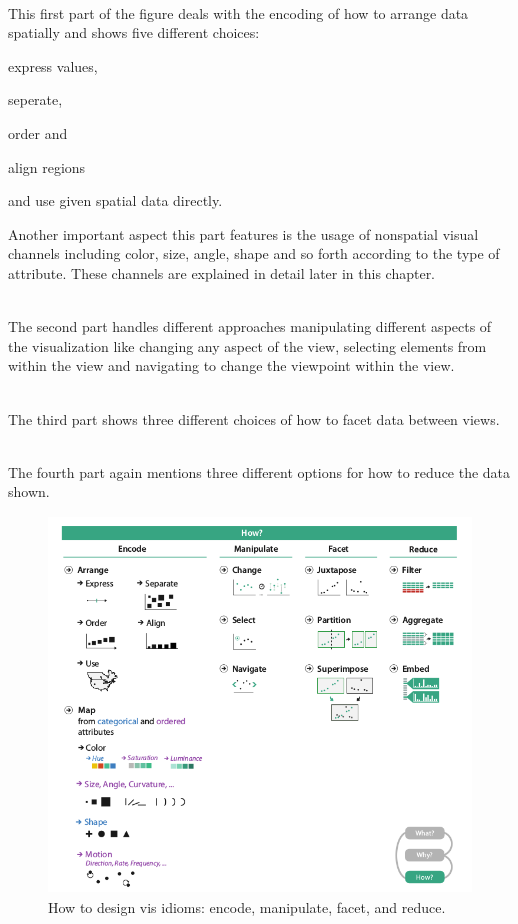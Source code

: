 \begin{enumerate}

 \hfill \\
This first part of the figure deals with the encoding of how to arrange data spatially and shows five different choices:
    \begin{enumerate*}
    \item express values,
    \item seperate,
    \item order and
    \item align regions
    \item and use given spatial data directly.
    \end{enumerate*}
Another important aspect this part features is the usage of nonspatial visual channels including color, size, angle, shape and so forth according to the type of attribute. These channels are explained in detail later in this chapter.

 \hfill \\
The second part handles different approaches manipulating different aspects of the visualization like changing any aspect of the view, selecting elements from within the view and navigating to change the viewpoint within the view.

 \hfill \\
The third part shows three different choices of how to facet data between views.

 \hfill \\
The fourth part again mentions three different options for how to reduce the data shown.

\end{enumerate}

\begin{figure}[!hbt]
\centering
\includegraphics[height=10cm,keepaspectratio]{images/basics/how.png}
\caption[
    How to design vis idioms: encode, manipulate, facet, and reduce .
]{How to design vis idioms: encode, manipulate, facet, and reduce.}
\label{fig:how}
\end{figure}

